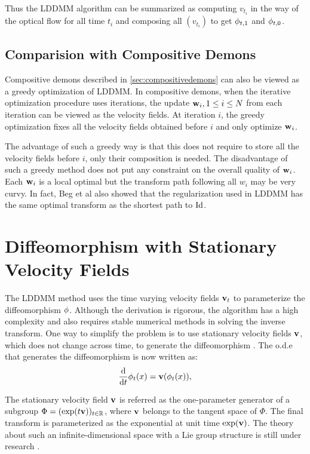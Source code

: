 \documentclass[letterpaper,12pt]{article}
\begin{document}
Thus the LDDMM algorithm can be summarized as computing $v_{t_i}$ in the way of the optical flow for all time $t_i$ and composing all $(v_{t_i})$ to get $\phi_{t, 1}$ and $\phi_{t, 0}$.


\subsection{Comparision with Compositive Demons}

Compositive demons described in \ref{sec:compositivedemons} can also be viewed as a greedy optimization of LDDMM. In compositive demons, when the iterative optimization procedure uses iterations, the update $\mathbf{w}_i, 1 \leq i \leq N$ from each iteration can be viewed as the velocity fields. At iteration $i$, the greedy optimization fixes all the velocity fields obtained before $i$ and only optimize $\mathbf{w}_i$. 

The advantage of such a greedy way is that this does not require to store all the velocity fields before $i$, only their composition is needed. The disadvantage of such a greedy method does not put any constraint on the overall quality of $\mathbf{w}_i$. Each $\mathbf{w}_i$ is a local optimal but the transform path following all $w_i$ may be very curvy. In fact, Beg et al also \cite{Beg2005Computing} showed that the regularization used in LDDMM has the same optimal transform as the shortest path to $\text{Id}$.


\section{Diffeomorphism with Stationary Velocity Fields}

The LDDMM method \cite{Beg2005Computing} uses the time varying
velocity fields $\mathbf{v}_t$ to parameterize the diffeomorphism
$\phi$. Although the derivation is rigorous, the algorithm has a high complexity and also requires stable numerical methods in solving the inverse transform. One way to simplify the problem is to use stationary velocity fields $\mathbf{v}$, which does not change across time, to generate the diffeomorphism \cite{Arsigny2006,Ashburner2007,Vercauteren2007,Vercauteren2008Symmetric,Hernandez2009}. The o.d.e that generates the diffeomorphism is now written as:
\begin{align}
\frac{\text{d}}{\text{d} t} \phi_t(x) = \mathbf{v}(\phi_t(x)), 
\end{align}

The stationary velocity field $\mathbf{v}$ is referred as the one-parameter generator of a subgroup $\Phi=(\exp(t\mathbf{v}))_{t \in \mathbb{R}}$, where $\mathbf{v}$ belongs to the tangent space of $\Phi$. The final transform is parameterized as the exponential at unit time $\exp(\mathbf{v})$. The theory about such an infinite-dimensional space with a Lie group structure is still under research \cite{Arsigny2006, Vercauteren2008Symmetric, Sternberg1964, Mahony2002}.  
\end{document}
